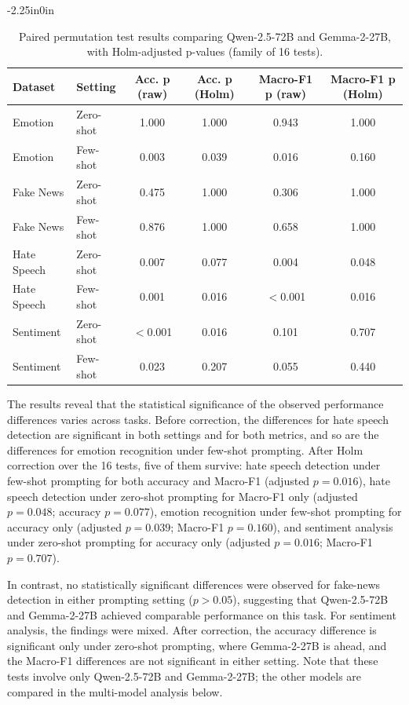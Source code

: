 \documentclass[10pt,letterpaper]{article}
\begin{document}
\begin{table}[!t]
\begin{adjustwidth}{-2.25in}{0in}
\centering
\small
\caption{Paired permutation test results comparing Qwen-2.5-72B and Gemma-2-27B, with Holm-adjusted p-values (family of 16 tests).}
\label{tab:significance_results}
\renewcommand{\arraystretch}{1.1}
\setlength{\tabcolsep}{5pt}
\begin{tabular}{|l|l|c|c|c|c|}
\hline
\textbf{Dataset} & \textbf{Setting} & \textbf{Acc. p (raw)} & \textbf{Acc. p (Holm)} & \textbf{Macro-F1 p (raw)} & \textbf{Macro-F1 p (Holm)} \\ 
\hline
Emotion & Zero-shot & 1.000 & 1.000 & 0.943 & 1.000 \\ 
Emotion & Few-shot & 0.003 & 0.039 & 0.016 & 0.160 \\ 
\hline
Fake News & Zero-shot & 0.475 & 1.000 & 0.306 & 1.000 \\ 
Fake News & Few-shot & 0.876 & 1.000 & 0.658 & 1.000 \\ 
\hline
Hate Speech & Zero-shot & 0.007 & 0.077 & 0.004 & 0.048 \\ 
Hate Speech & Few-shot & 0.001 & 0.016 & $<$0.001 & 0.016 \\ 
\hline
Sentiment & Zero-shot & $<$0.001 & 0.016 & 0.101 & 0.707 \\ 
Sentiment & Few-shot & 0.023 & 0.207 & 0.055 & 0.440 \\ 
\hline
\end{tabular}
\end{adjustwidth}
\end{table}

The results reveal that the statistical significance of the observed performance differences varies across tasks. Before correction, the differences for hate speech detection are significant in both settings and for both metrics, and so are the differences for emotion recognition under few-shot prompting. After Holm correction over the 16 tests, five of them survive: hate speech detection under few-shot prompting for both accuracy and Macro-F1 (adjusted $p = 0.016$), hate speech detection under zero-shot prompting for Macro-F1 only (adjusted $p = 0.048$; accuracy $p = 0.077$), emotion recognition under few-shot prompting for accuracy only (adjusted $p = 0.039$; Macro-F1 $p = 0.160$), and sentiment analysis under zero-shot prompting for accuracy only (adjusted $p = 0.016$; Macro-F1 $p = 0.707$).

In contrast, no statistically significant differences were observed for fake-news detection in either prompting setting ($p > 0.05$), suggesting that Qwen-2.5-72B and Gemma-2-27B achieved comparable performance on this task. For sentiment analysis, the findings were mixed. After correction, the accuracy difference is significant only under zero-shot prompting, where Gemma-2-27B is ahead, and the Macro-F1 differences are not significant in either setting. Note that these tests involve only Qwen-2.5-72B and Gemma-2-27B; the other models are compared in the multi-model analysis below.
\end{document}
